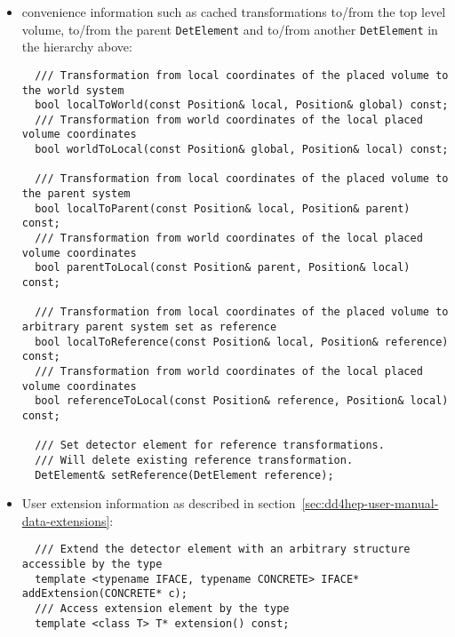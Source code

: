 \begin{itemize}

\item convenience information such as cached transformations to/from the top level volume, to/from the parent \texttt{DetElement} and to/from another \texttt{DetElement} in the hierarchy above:
\begin{verbatim}
  /// Transformation from local coordinates of the placed volume to the world system
  bool localToWorld(const Position& local, Position& global) const;
  /// Transformation from world coordinates of the local placed volume coordinates
  bool worldToLocal(const Position& global, Position& local) const;

  /// Transformation from local coordinates of the placed volume to the parent system
  bool localToParent(const Position& local, Position& parent) const;
  /// Transformation from world coordinates of the local placed volume coordinates
  bool parentToLocal(const Position& parent, Position& local) const;

  /// Transformation from local coordinates of the placed volume to arbitrary parent system set as reference
  bool localToReference(const Position& local, Position& reference) const;
  /// Transformation from world coordinates of the local placed volume coordinates
  bool referenceToLocal(const Position& reference, Position& local) const;

  /// Set detector element for reference transformations. 
  /// Will delete existing reference transformation.
  DetElement& setReference(DetElement reference);
\end{verbatim}

\item User extension information as described in section~\ref{sec:dd4hep-user-manual-data-extensions}:
\begin{verbatim}
  /// Extend the detector element with an arbitrary structure accessible by the type
  template <typename IFACE, typename CONCRETE> IFACE* addExtension(CONCRETE* c);
  /// Access extension element by the type
  template <class T> T* extension() const;
\end{verbatim}

\end{itemize}

